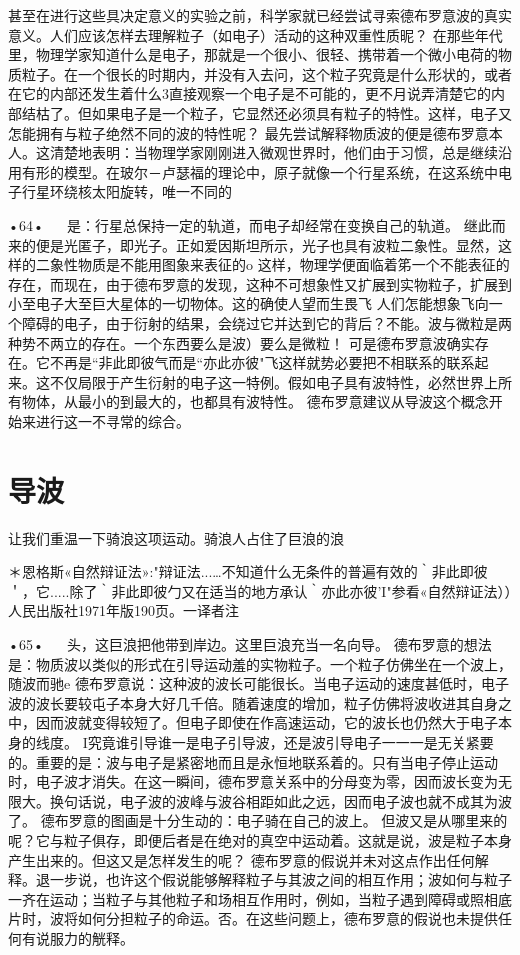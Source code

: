 甚至在进行这些具决定意义的实验之前，科学家就已经尝试寻索德布罗意波的真实意义。人们应该怎样去理解粒子（如电子）活动的这种双重性质昵？
在那些年代里，物理学家知道什么是电子，那就是一个很小、很轻、携带着一个微小电荷的物质粒子。在一个很长的时期内，并没有入去问，这个粒子究竟是什么形状的，或者在它的内部还发生着什么3直接观察一个电子是不可能的，更不月说弄清楚它的内部结枯了。但如果电子是一个粒子，它显然还必须具有粒子的特性。这样，电子又怎能拥有与粒子绝然不同的波的特性呢？
最先尝试解释物质波的便是德布罗意本人。这清楚地表明：当物理学家刚刚进入微观世界时，他们由于习惯，总是继续沿用有形的模型。在玻尔－卢瑟福的理论中，原子就像一个行星系统，在这系统中电子行星环绕核太阳旋转，唯一不同的

•64•
  
是：行星总保持一定的轨道，而电子却经常在变换自己的轨道。
继此而来的便是光匿子，即光子。正如爱因斯坦所示，光子也具有波粒二象性。显然，这样的二象性物质是不能用图象来表征的o
这样，物理学便面临着笫一个不能表征的存在，而现在，由于德布罗意的发现，这种不可想象性又扩展到实物粒子，扩展到小至电子大至巨大星体的一切物体。这的确使人望而生畏飞
人们怎能想象飞向一个障碍的电子，由于衍射的结果，会绕过它并达到它的背后？不能。波与微粒是两种势不两立的存在。一个东西要么是波）要么是微粒！
可是德布罗意波确实存在。它不再是“非此即彼气而是“亦此亦彼"飞这样就势必要把不相联系的联系起来。这不仅局限于产生衍射的电子这一特例。假如电子具有波特性，必然世界上所有物体，从最小的到最大的，也都具有波特性。
德布罗意建议从导波这个概念开始来进行这一不寻常的综合。

\section{导波}
让我们重温一下骑浪这项运动。骑浪人占住了巨浪的浪

＊恩格斯«自然辩证法»:"辩证法...…不知道什么无条件的普遍有效的｀非此即彼＇，它.....除了｀非此即彼勹又在适当的地方承认｀亦此亦彼'I"参看«自然辩证法））人民出版社1971年版190页。一译者注

•65•
  
头，这巨浪把他带到岸边。这里巨浪充当一名向导。
德布罗意的想法是：物质波以类似的形式在引导运动羞的实物粒子。一个粒子仿佛坐在一个波上，随波而驰e
德布罗意说：这种波的波长可能很长。当电子运动的速度甚低时，电子波的波长要较屯子本身大好几千倍。随着速度的增加，粒子仿佛将波收进其自身之中，因而波就变得较短了。但电子即使在作高速运动，它的波长也仍然大于电子本身的线度。
I究竟谁引导谁一是电子引导波，还是波引导电子一一一是无关紧要的。重要的是：波与电子是紧密地而且是永恒地联系着的。只有当电子停止运动时，电子波才消失。在这一瞬间，德布罗意关系中的分母变为零，因而波长变为无限大。换句话说，电子波的波峰与波谷相距如此之远，因而电子波也就不成其为波了。
德布罗意的图画是十分生动的：电子骑在自己的波上。
但波又是从哪里来的呢？它与粒子俱存，即便后者是在绝对的真空中运动着。这就是说，波是粒子本身产生出来的。但这又是怎样发生的呢？
德布罗意的假说并未对这点作出任何解释。退一步说，也许这个假说能够解释粒子与其波之间的相互作用；波如何与粒子一齐在运动；当粒子与其他粒子和场相互作用时，例如，当粒子遇到障碍或照相底片时，波将如何分担粒子的命运。否。在这些问题上，德布罗意的假说也未提供任何有说服力的觥释。


